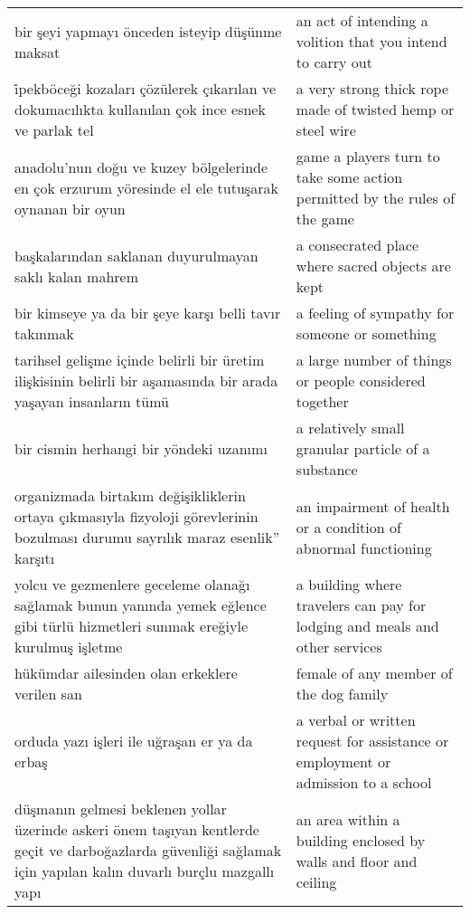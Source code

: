 \begin{longtable}{p{} p{}}
    \cmidrule(rl){1-2}
    bir şeyi yapmayı önceden isteyip düşünme maksat & an act of intending a volition that you intend to carry out \\
    \cmidrule(rl){1-2}
    i̇pekböceği kozaları çözülerek çıkarılan ve dokumacılıkta kullanılan çok ince esnek ve parlak tel & a very strong thick rope made of twisted hemp or steel wire \\
    \cmidrule(rl){1-2}
    anadolu’nun doğu ve kuzey bölgelerinde en çok erzurum yöresinde el ele tutuşarak oynanan bir oyun & game a players turn to take some action permitted by the rules of the game \\
    \cmidrule(rl){1-2}
    başkalarından saklanan duyurulmayan saklı kalan mahrem & a consecrated place where sacred objects are kept \\
    \cmidrule(rl){1-2}
    bir kimseye ya da bir şeye karşı belli tavır takınmak & a feeling of sympathy for someone or something \\
    \cmidrule(rl){1-2}
    tarihsel gelişme içinde belirli bir üretim ilişkisinin belirli bir aşamasında bir arada yaşayan insanların tümü & a large number of things or people considered together \\
    \cmidrule(rl){1-2}
    bir cismin herhangi bir yöndeki uzanımı & a relatively small granular particle of a substance \\
    \cmidrule(rl){1-2}
    organizmada birtakım değişikliklerin ortaya çıkmasıyla fizyoloji görevlerinin bozulması durumu sayrılık maraz esenlik” karşıtı & an impairment of health or a condition of abnormal functioning \\
    \cmidrule(rl){1-2}
    yolcu ve gezmenlere geceleme olanağı sağlamak bunun yanında yemek eğlence gibi  türlü hizmetleri sunmak ereğiyle kurulmuş işletme & a building where travelers can pay for lodging and meals and other services \\
    \cmidrule(rl){1-2}
    hükümdar ailesinden olan erkeklere verilen san & female of any member of the dog family \\
    \cmidrule(rl){1-2}
    orduda yazı işleri ile uğraşan er ya da erbaş & a verbal or written request for assistance or employment or admission to a school \\
    \cmidrule(rl){1-2}
    düşmanın gelmesi beklenen yollar üzerinde askeri önem taşıyan kentlerde geçit ve darboğazlarda güvenliği sağlamak için yapılan kalın duvarlı  burçlu mazgallı yapı & an area within a building enclosed by walls and floor and ceiling \\

\end{longtable}
